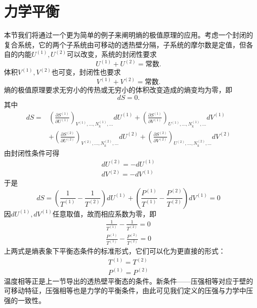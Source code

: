 \section{力学平衡}
\label{sec2.7}
本节我们将通过一个更为简单的例子来阐明熵的极值原理的应用。考虑一个封闭的复合系统，它的两个子系统由可移动的透热壁分隔，子系统的摩尔数是定值，但各自的内能$U^{(1)}, U^{(2)}$可以改变，系统的封闭性要求
\begin{equation}
\label{equ2.46}
	U^{(1)} + U^{(2)} = \text{常数}.
\end{equation}
体积$V^{(1)}, V^{(2)}$也可变，封闭性也要求
\begin{equation}
\label{equ2.47}
	V^{(1)} + V^{(2)} = \text{常数}.
\end{equation}
熵的极值原理要求无穷小的传热或无穷小的体积改变造成的熵变均为零，即
\begin{equation}
\label{equ2.48}
	dS = 0.
\end{equation}
其中
\begin{equation}
\label{equ2.49}
\begin{split}
	dS =& \left( \frac{ \partial S^{(1)} }{ \partial U^{(1)} } \right)_{ V^{(1)}, \dots, N_k^{(1)}, \dots} dU^{(1)} + \left( \frac{ \partial S^{(1)} }{ \partial V^{(1)} } \right)_{ U^{(1)}, \dots, N_k^{(1)}, \dots} dV^{(1)} \\
	&+ \left( \frac{ \partial S^{(2)} }{ \partial U^{(2)} } \right)_{ V^{(2)}, \dots, N_k^{(2)}, \dots} dU^{(2)} + \left( \frac{ \partial S^{(2)} }{ \partial V^{(2)} } \right)_{ U^{(2)}, \dots, N_k^{(2)}, \dots} dV^{(2)}
\end{split}
\end{equation}
由封闭性条件可得
\begin{align}
\label{equ2.50}
	dU^{(2)} = -dU^{(1)} \\
\label{equ2.51}
	dV^{(2)} = -dV^{(1)}
\end{align}
于是
\begin{equation}
\label{equ2.52}
	dS = \left( \frac{1}{T^{(1)}} - \frac{1}{T^{(2)}} \right) dU^{(1)} + \left( \frac{ P^{(1)} }{ T^{(1)} } - \frac{ P^{(2)} }{ T^{(2)} } \right) dV^{(1)} = 0
\end{equation}
因$dU^{(1)}, dV^{(1)}$任意取值，故而相应系数为零，即
\begin{align}
	\frac{1}{T^{(1)}} - \frac{1}{T^{(2)}} = 0 \label{equ2.53} \\
	\frac{ P^{(1)} }{ T^{(1)} } - \frac{ P^{(2)} }{ T^{(2)} } = 0 \label{equ2.54}
\end{align}
上两式是熵表象下平衡态条件的标准形式，它们可以化为更直接的形式：
\begin{align}
	T^{(1)} = T^{(2)} \label{equ2.55} \\
	P^{(1)} = P^{(2)} \label{equ2.56}
\end{align}
温度相等正是上一节导出的透热壁平衡态的条件。新条件——压强相等对应于壁的可移动特征，压强相等也是力学的平衡条件，由此可见我们定义的压强与力学中压强的一致性。

